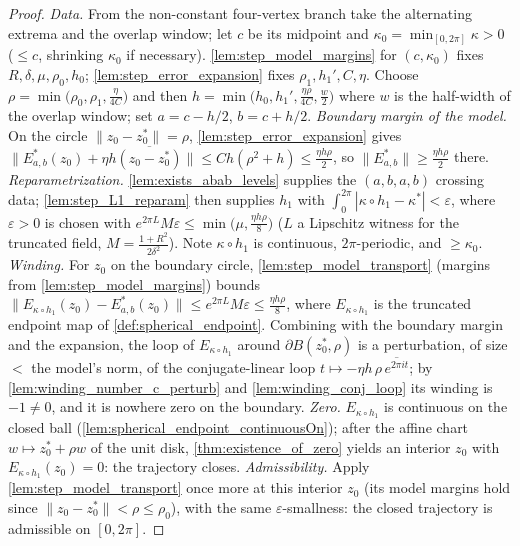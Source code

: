 \begin{proof}

\leanok
  \emph{Data.} From the non-constant four-vertex branch take the alternating extrema and
  the overlap window; let $c$ be its midpoint and $\kappa_0=\min_{[0,2\pi]}\kappa>0$
  ($\le c$, shrinking $\kappa_0$ if necessary). \cref{lem:step_model_margins} for
  $(c,\kappa_0)$ fixes $R,\delta,\mu,\rho_0,h_0$; \cref{lem:step_error_expansion} fixes
  $\rho_1,h_1',C,\eta$. Choose
  $\rho=\min\bigl(\rho_0,\rho_1,\tfrac{\eta}{4C}\bigr)$ and then
  $h=\min\bigl(h_0,h_1',\tfrac{\eta\rho}{4C},\tfrac{w}{2}\bigr)$ where $w$ is the
  half-width of the overlap window; set $a=c-h/2$, $b=c+h/2$.
  \emph{Boundary margin of the model.} On the circle $\|z_0-z_0^\ast\|=\rho$,
  \cref{lem:step_error_expansion} gives
  $\|E^\ast_{a,b}(z_0)+\eta h\overline{(z_0-z_0^\ast)}\|\le Ch(\rho^2+h)\le
  \tfrac{\eta h\rho}{2}$, so $\|E^\ast_{a,b}\|\ge\tfrac{\eta h\rho}{2}$ there.
  \emph{Reparametrization.} \cref{lem:exists_abab_levels} supplies the $(a,b,a,b)$
  crossing data; \cref{lem:step_L1_reparam} then supplies $h_1$ with
  $\int_0^{2\pi}|\kappa\circ h_1-\kappa^\ast|<\varepsilon$, where $\varepsilon>0$ is
  chosen with $e^{2\pi L}M\varepsilon\le\min\bigl(\mu,\tfrac{\eta h\rho}{8}\bigr)$
  ($L$ a Lipschitz witness for the truncated field, $M=\tfrac{1+R^2}{2\delta^2}$). Note
  $\kappa\circ h_1$ is continuous, $2\pi$-periodic, and $\ge\kappa_0$.
  \emph{Winding.} For $z_0$ on the boundary circle, \cref{lem:step_model_transport}
  (margins from \cref{lem:step_model_margins}) bounds
  $\|E_{\kappa\circ h_1}(z_0)-E^\ast_{a,b}(z_0)\|\le e^{2\pi L}M\varepsilon\le
  \tfrac{\eta h\rho}{8}$, where $E_{\kappa\circ h_1}$ is the truncated endpoint map of
  \cref{def:spherical_endpoint}. Combining with the boundary margin and the expansion,
  the loop of $E_{\kappa\circ h_1}$ around $\partial B(z_0^\ast,\rho)$ is a
  perturbation, of size $<$ the model's norm, of the conjugate-linear loop
  $t\mapsto-\eta h\,\rho\,\overline{e^{2\pi it}}$; by
  \cref{lem:winding_number_c_perturb} and \cref{lem:winding_conj_loop} its winding is
  $-1\ne0$, and it is nowhere zero on the boundary.
  \emph{Zero.} $E_{\kappa\circ h_1}$ is continuous on the closed ball
  (\cref{lem:spherical_endpoint_continuousOn}); after the affine chart
  $w\mapsto z_0^\ast+\rho w$ of the unit disk, \cref{thm:existence_of_zero} yields an
  interior $z_0$ with $E_{\kappa\circ h_1}(z_0)=0$: the trajectory closes.
  \emph{Admissibility.} Apply \cref{lem:step_model_transport} once more at this interior
  $z_0$ (its model margins hold since $\|z_0-z_0^\ast\|<\rho\le\rho_0$), with the same
  $\varepsilon$-smallness: the closed trajectory is admissible on $[0,2\pi]$.
\end{proof}

